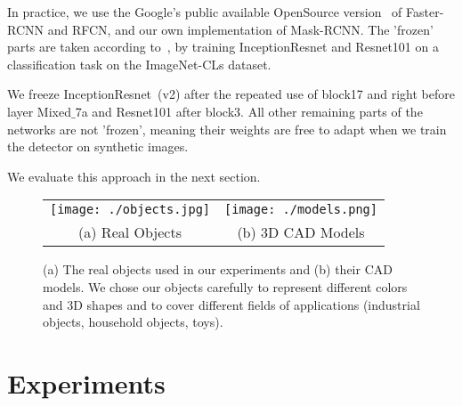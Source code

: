 \documentclass[10pt,twocolumn,letterpaper]{article}
\newcommand{\vincentrmk}[1]{{\color{ForestGreen}\bf #1}}
\newcommand{\comment}[1]{}
\begin{document}
In    practice,   we    use   the    Google's   public    available   OpenSource
version~\cite{Huang17} of  Faster-RCNN and RFCN,  and our own  implementation of
Mask-RCNN. The 'frozen' parts are taken according to~\cite{Huang17}, by training
InceptionResnet  and Resnet101  on  a classification  task  on the  ImageNet-CLs
dataset.
\comment{
\vincentrmk{Can you give more details  on this classification task? Maybe
  a  reference?} The reference is the same as Huang17 - I asked them about details and this is what I got back:
In some cases (VGG, Resnet), where the network originated from outside Google, we convert Caffe weights from the original authors.  In cases where the network was trained within Google like Inception or Mobilenet, then it's always through slim and is equivalent to the imagenet training code that we've released to open source.
}  
We  freeze  InceptionResnet~(v2) after  the  repeated use  of
block17  and right  before layer  Mixed$\_$7a and  Resnet101 after  block3.  All
other remaining  parts of the networks  are not 'frozen', meaning  their weights
are free to adapt when we train the detector on synthetic images.

We evaluate this approach in the next section.


  









\begin{figure}
\begin{center}
\begin{tabular}{cc}
\texttt{[image: ./objects.jpg]} &
\texttt{[image: ./models.png]} \\
(a) Real Objects &
(b) 3D CAD Models \\
\end{tabular}
\end{center}
\caption{\label{fig:models} (a) The real objects used in our experiments and
(b)  their CAD  models.  We chose  our  objects
  carefully to represent  different colors and 3D shapes and  to cover different
  fields of applications (industrial objects, household objects, toys). }
\end{figure}

\section{Experiments}
\label{sec:epxeriments}
\end{document}
